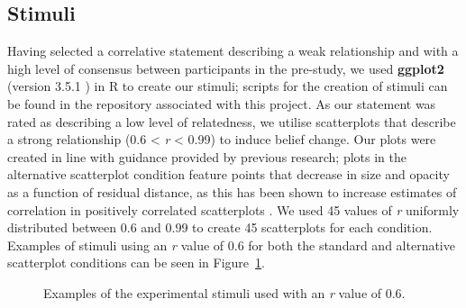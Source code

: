 \documentclass[sigconf]{acmart}
\begin{document}
\subsection{Stimuli}\label{sec-stimuli-main}

Having selected a correlative statement describing a weak relationship
and with a high level of consensus between participants in the
pre-study, we used \textbf{ggplot2} (version 3.5.1 \citep{ggplot}) in R
to create our stimuli; scripts for the creation of stimuli can be found
in the repository associated with this project. As our statement was
rated as describing a low level of relatedness, we utilise scatterplots
that describe a strong relationship (0.6 \textless{} \emph{r}
\textless{} 0.99) to induce belief change. Our plots were created in
line with guidance provided by previous research; plots in the
alternative scatterplot condition feature points that decrease in size
and opacity as a function of residual distance, as this has been shown
to increase estimates of correlation in positively correlated
scatterplots \citep{strain_2023, strain_2023b, strain_2024}. We used 45
values of \emph{r} uniformly distributed between 0.6 and 0.99 to create
45 scatterplots for each condition. Examples of stimuli using an
\emph{r} value of 0.6 for both the standard and alternative scatterplot
conditions can be seen in Figure~\ref{fig-main-examples}.

\begin{figure}


\caption{\label{fig-main-examples}Examples of the experimental stimuli
used with an \textit{r} value of 0.6.}

\end{figure}%
\end{document}
